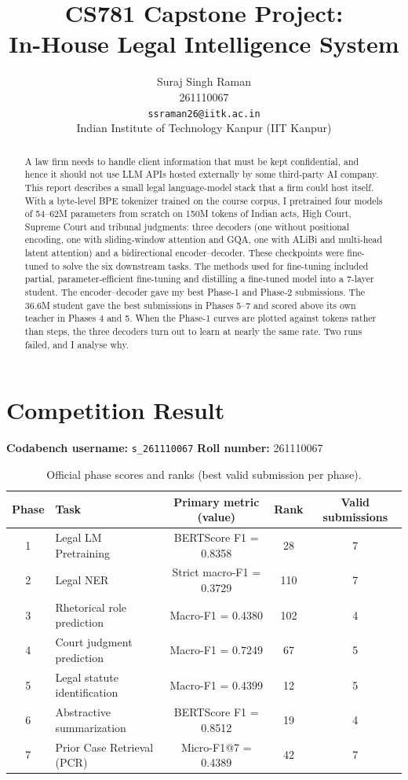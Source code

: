 \documentclass[11pt, oneside]{article}
\title{CS781 Capstone Project:\\
In-House Legal Intelligence System}
\author{
    Suraj Singh Raman  \\
    261110067 \\
    {\tt ssraman26@iitk.ac.in}\\
    Indian Institute of Technology Kanpur (IIT Kanpur)
}
\date{}
\begin{document}
\maketitle
\begin{abstract}
A law firm needs to handle client information that must be kept confidential, and hence it should not use LLM APIs hosted externally by some third-party AI company.
This report describes a small legal language-model stack that a firm could host itself. With a byte-level BPE tokenizer trained on the course corpus, I pretrained four models of 54--62M parameters from scratch on 150M tokens of Indian acts, High Court, Supreme Court and tribunal judgments: three decoders (one without positional encoding, one with sliding-window attention and GQA, one with ALiBi and multi-head latent attention) and a bidirectional encoder--decoder. These checkpoints were fine-tuned to solve the six downstream tasks. The methods used for fine-tuning included partial, parameter-efficient fine-tuning and distilling a fine-tuned model into a 7-layer student. The encoder--decoder gave my best Phase-1 and Phase-2 submissions. The 36.6M student gave the best submissions in Phases 5--7 and scored above its own teacher in Phases 4 and 5. When the Phase-1 curves are plotted against tokens rather than steps, the three decoders turn out to learn at nearly the same rate. Two runs failed, and I analyse why.
\end{abstract}

\section{Competition Result}
\noindent
\textbf{Codabench username:} \texttt{s\_261110067}
\hfill
\textbf{Roll number:} 261110067

\begin{table}[H]
\centering
\small
\caption{Official phase scores and ranks (best valid submission per phase).}
\label{tab:leaderboard}
\begin{tabular}{clccc}
\toprule
Phase & Task & Primary metric (value) & Rank & Valid submissions \\
\midrule
1 & Legal LM Pretraining & BERTScore F1 = 0.8358 & 28 & 7 \\
2 & Legal NER & Strict macro-F1 = 0.3729 & 110 & 7 \\
3 & Rhetorical role prediction & Macro-F1 = 0.4380 & 102 & 4 \\
4 & Court judgment prediction & Macro-F1 = 0.7249 & 67 & 5 \\
5 & Legal statute identification & Macro-F1 = 0.4399 & 12 & 5 \\
6 & Abstractive summarization & BERTScore F1 = 0.8512 & 19 & 4 \\
7 & Prior Case Retrieval (PCR) & Micro-F1@7 = 0.4389 & 42 & 7 \\
\bottomrule
\end{tabular}
\end{table}
\end{document}
